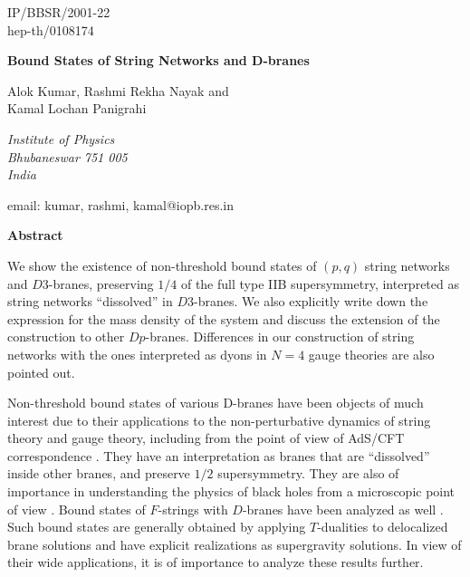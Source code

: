 \documentclass[a4paper,12pt]{article}
\begin{document}
\topmargin 0pt
\oddsidemargin 0mm

\renewcommand{\thefootnote}{\fnsymbol{footnote}}
\begin{titlepage}
\begin{flushright}
IP/BBSR/2001-22\\
hep-th/0108174
\end{flushright}

\vspace{5mm}
\begin{center}
{\Large \bf Bound States of String Networks and D-branes}
\vspace{6mm}

{\large
Alok Kumar, Rashmi Rekha Nayak and\\
Kamal Lochan Panigrahi}\\
\vspace{5mm}
{\em Institute of Physics\\ 
Bhubaneswar 751 005\\ India\\
\vspace{3mm}

email: kumar, rashmi, kamal@iopb.res.in}

\end{center}
\vspace{5mm}
\centerline{{\bf{Abstract}}}
\vspace{5mm}
We show the existence of non-threshold bound states of  
$(p, q)$ string networks and $D3$-branes, preserving $1/4$ 
of the full type IIB supersymmetry, interpreted as string 
networks ``dissolved'' in $D3$-branes. 
We also explicitly write down the expression 
for the mass density of the system and discuss the extension 
of the construction to other $Dp$-branes. 
Differences in our construction of string networks with the ones
interpreted as dyons in $N=4$ gauge theories are also pointed out. 


\end{titlepage}


\newpage
Non-threshold bound states of various D-branes 
\cite{witten,myers} 
have been objects of much interest due to 
their applications to the non-perturbative dynamics of string
theory and gauge theory, including from the point of view of AdS/CFT 
correspondence \cite{malda-russo,oz}. They have an
interpretation as branes that are ``dissolved'' inside other branes,
and preserve $1/ 2$ supersymmetry. 
They are also of importance in understanding 
the physics of black holes from a microscopic point of 
view \cite{maldacena}. Bound states of 
$F$-strings with $D$-branes have been analyzed as well 
\cite{russo-tsey,costa}. 
Such bound states are generally obtained by applying 
$T$-dualities \cite{pol} to delocalized brane solutions and have explicit
realizations as supergravity solutions. In view of their wide 
applications, it is of importance to analyze these results
further. 
\end{document}
